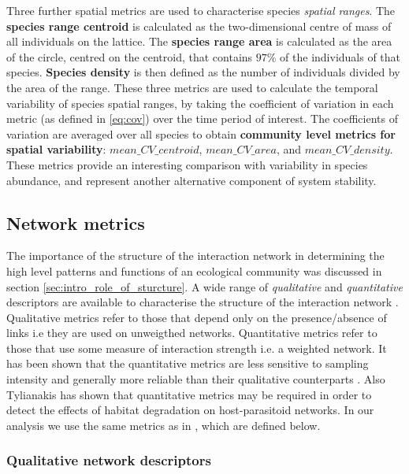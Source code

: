 Three further spatial metrics are used to characterise species \emph{spatial ranges}. The \textbf{species range centroid} is calculated as the two-dimensional centre of mass of all individuals on the lattice. The \textbf{species range area} is calculated as the area of the circle, centred on the centroid, that contains $97\%$ of the individuals of that species. \textbf{Species density} is then defined as the number of individuals divided by the area of the range. These three metrics are used to calculate the temporal variability of species spatial ranges, by taking the coefficient of variation in each metric (as defined in \eqref{eq:cov}) over the time period of interest. The coefficients of variation are averaged over all species to obtain \textbf{community level metrics for spatial variability}: $mean\_CV\_centroid$, $mean\_CV\_area$, and $mean\_CV\_density$. These metrics provide an interesting comparison with variability in species abundance, and represent another alternative component of system stability.


\subsection{Network metrics}
\label{sec:define_network_metrics}

The importance of the structure of the interaction network in determining the high level patterns and functions of an ecological community was discussed in section \ref{sec:intro_role_of_sturcture}. A wide range of \emph{qualitative} and \emph{quantitative} descriptors are available to characterise the structure of the interaction network \cite{bluthgen2008interaction, lurgi2015effects, tylianakis2007habitat,bersier2002quantitative}. Qualitative metrics refer to those that depend only on the presence/absence of links i.e they are used on unweigthed networks. Quantitative metrics refer to those that use some measure of interaction strength i.e. a weighted network. It has been shown that the quantitative metrics are less sensitive to sampling intensity and generally more reliable than their qualitative counterparts \cite{banavsek2004sampling, bluthgen2006measuring}. Also Tylianakis has shown \cite{tylianakis2007habitat} that quantitative metrics may be required in order to detect the effects of habitat degradation on host-parasitoid networks. In our analysis we use the same metrics as in \cite{lurgi2015effects}, which are defined below.


\subsubsection{Qualitative network descriptors}
\label{sec:def_qual_metrics}


